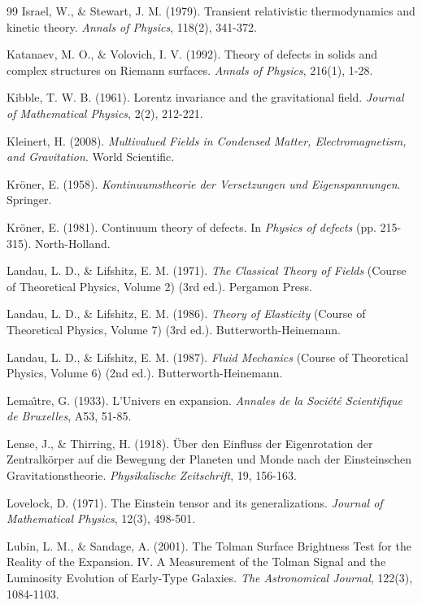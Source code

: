 \begin{thebibliography}{99}
Israel, W., \& Stewart, J. M. (1979). Transient relativistic thermodynamics and kinetic theory. \textit{Annals of Physics}, 118(2), 341-372.

Katanaev, M. O., \& Volovich, I. V. (1992). Theory of defects in solids and complex structures on Riemann surfaces. \textit{Annals of Physics}, 216(1), 1-28.

Kibble, T. W. B. (1961). Lorentz invariance and the gravitational field. \textit{Journal of Mathematical Physics}, 2(2), 212-221.

Kleinert, H. (2008). \textit{Multivalued Fields in Condensed Matter, Electromagnetism, and Gravitation}. World Scientific.

Kr\"{o}ner, E. (1958). \textit{Kontinuumstheorie der Versetzungen und Eigenspannungen}. Springer.

Kr\"{o}ner, E. (1981). Continuum theory of defects. In \textit{Physics of defects} (pp. 215-315). North-Holland.

Landau, L. D., \& Lifshitz, E. M. (1971). \textit{The Classical Theory of Fields} (Course of Theoretical Physics, Volume 2) (3rd ed.). Pergamon Press.

Landau, L. D., \& Lifshitz, E. M. (1986). \textit{Theory of Elasticity} (Course of Theoretical Physics, Volume 7) (3rd ed.). Butterworth-Heinemann.

Landau, L. D., \& Lifshitz, E. M. (1987). \textit{Fluid Mechanics} (Course of Theoretical Physics, Volume 6) (2nd ed.). Butterworth-Heinemann.

Lema\^{\i}tre, G. (1933). L'Univers en expansion. \textit{Annales de la Soci\'{e}t\'{e} Scientifique de Bruxelles}, A53, 51-85.

Lense, J., \& Thirring, H. (1918). \"{U}ber den Einfluss der Eigenrotation der Zentralk\"{o}rper auf die Bewegung der Planeten und Monde nach der Einsteinschen Gravitationstheorie. \textit{Physikalische Zeitschrift}, 19, 156-163.

Lovelock, D. (1971). The Einstein tensor and its generalizations. \textit{Journal of Mathematical Physics}, 12(3), 498-501.

Lubin, L. M., \& Sandage, A. (2001). The Tolman Surface Brightness Test for the Reality of the Expansion. IV. A Measurement of the Tolman Signal and the Luminosity Evolution of Early-Type Galaxies. \textit{The Astronomical Journal}, 122(3), 1084-1103.


\end{thebibliography}
